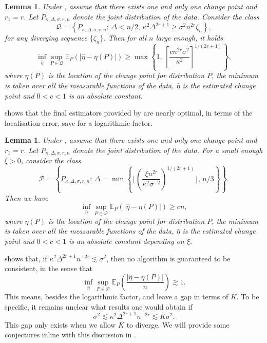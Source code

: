 \documentclass{article}
\newtheorem{lemma}[theorem]{Lemma}
\begin{document}
\begin{lemma}\label{lem-lb-2}
Under , assume that there exists one and only one change point and $r_1 = r$.  Let $P_{\kappa, \Delta, \sigma, r, n}$ denote the joint distribution of the data.  Consider the class
	\[
		\mathcal{Q} = \left\{P_{\kappa, \Delta, \sigma, r, n}: \, \Delta < n/2,  \, \kappa^2 \Delta^{2r+1} \geq \sigma^2 n^{2r} \zeta_n\right\},
	\]
	for any diverging sequence $\{\zeta_n\}$.  Then for all $n$ large enough, it holds
	\[
		\inf_{\widehat{\eta}} \sup_{P \in \mathcal{Q}} \mathbb{E}_P(|\widehat{\eta} - \eta(P)|) \geq \max\left\{1, \, \left[\frac{c n^{2r} \sigma^2}{ \kappa^2}\right]^{1/(2r+1)}\right\},
	\]
	where $\eta(P)$ is the location of the change point for distribution $P$, the minimum is taken over all the measurable functions of the data, $\widehat{\eta}$ is the estimated change point and $0 < c < 1$ is an absolute constant.
\end{lemma}

 shows that the final estimators provided by  are nearly optimal, in terms of the localisation error, save for a logarithmic factor.  

\begin{lemma}\label{lem-lb-1}
Under , assume that there exists one and only one change point and $r_1 = r$.  Let $P_{\kappa, \Delta, \sigma, r, n}$ denote the joint distribution of the data.  For a small enough $\xi > 0$, consider the class
	\[
		\mathcal{P} = \left\{P_{\kappa, \Delta, \sigma, r, n}: \, \Delta = \min \left\{\Bigg\lfloor \left(\frac{\xi n^{2r}}{\kappa^2 \sigma^{-2} }\right)^{1/(2r+1)} \Bigg\rfloor,\, n/3 \right\} \right\}.
	\]	
	Then we have
	\[
		\inf_{\widehat{\eta}} \sup_{P \in \mathcal{P}} \mathbb{E}_P(|\widehat{\eta} - \eta(P)|) \geq cn,
	\]
	where $\eta(P)$ is the location of the change point for distribution $P$, the minimum is taken over all the measurable functions of the data, $\widehat{\eta}$ is the estimated change point and $0 < c < 1$ is an absolute constant depending on $\xi$.
\end{lemma}

 shows that, if $\kappa^2 \Delta^{2r+1}n^{-2r} \lesssim \sigma^2$, then no algorithm is guaranteed to be consistent, in the sense that
	\[
		\inf_{\widehat{\eta}} \sup_{P \in \mathcal{P}} \mathbb{E}_P\left(\frac{|\widehat{\eta} - \eta(P)|}{n}\right) \gtrsim 1.
	\]
	This means, besides the logarithmic factor,  and   leave a gap in terms of $K$.  To be specific, it remains unclear what results one would obtain if 
	\begin{equation}\label{eq-gapppp}
	\sigma^2 \lesssim \kappa^2 \Delta^{2r+1}n^{-2r} \lesssim K\sigma^2.
	\end{equation}  
	This gap only exists when we allow $K$ to diverge.   We will provide some conjectures inline with this discussion in .
		
\end{document}
